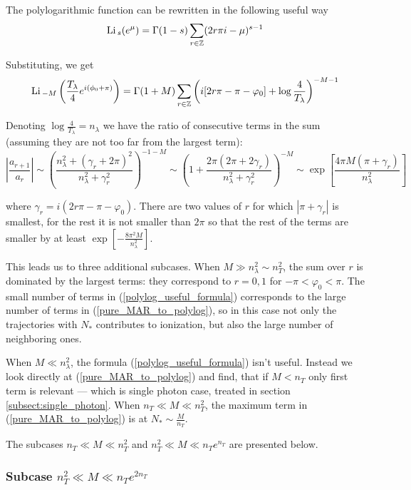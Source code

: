 The polylogarithmic function can be rewritten in the following useful way
\begin{gather}
\label{polylog_useful_formula}
	\mathrm{Li}\,_{s}(e^{\mu})=\Gamma(1-s)\sum_{r\in\mathbb{Z}}(2r\pi i-\mu)^{s-1}
\end{gather}

Substituting, we get
\[
\mathrm{Li}\,_{-M}\left(\frac{T_{\lambda}}{4}e^{i(\phi_{0}+\pi)}\right)=\Gamma(1+M)\sum_{r\in\mathbb{Z}}\left(i[2r\pi-\pi-\varphi_{0}]+\log\frac{4}{T_{\lambda}}\right)^{-M-1}
\]

Denoting $\log\frac{4}{T_{\lambda}}=n_{\lambda}$ we have the ratio
of consecutive terms in the sum (assuming they are not too far from
the largest term):
\[
\left|\frac{a_{r+1}}{a_{r}}\right|\sim\left(\frac{n_{\lambda}^{2}+(\gamma_{r}+2\pi)^{2}}{n_{\lambda}^{2}+\gamma_{r}^{2}}\right)^{-1-M}\sim\left(1+\frac{2\pi(2\pi+2\gamma_{r})}{n_{\lambda}^{2}+\gamma_{r}^{2}}\right)^{-M}\sim\exp\left[\frac{4\pi M(\pi+\gamma_{r})}{n_{\lambda}^{2}}\right]
\]

where $\gamma_{r}=i(2r\pi-\pi-\varphi_{0})$. There are two values of
$r$ for which $|\pi+\gamma_{r}|$ is smallest, for the rest it is
not smaller than $2\pi$ so that the rest of the terms are smaller
by at least 
$
\exp\left[-\frac{8\pi^{2}M}{n_{\lambda}^{2}}\right]
$.

This leads us to three additional subcases. When $ M \gg n_\lambda^2\sim n_T^2$, the sum over $ r $ is dominated by the  largest terms: they correspond to $ r=0,1 $ for $ -\pi<\varphi_0<\pi $. The small number of terms in (\ref{polylog_useful_formula}) corresponds to the large number of terms in (\ref{pure_MAR_to_polylog}), so in this case not only the trajectories with $ N_* $ contributes to ionization, but also the large number of neighboring ones.

When $ M\ll n_\lambda^2 $, the formula (\ref{polylog_useful_formula}) isn't useful. Instead we look directly at (\ref{pure_MAR_to_polylog}) and find, that if $ M<n_T $ only first term is relevant --- which is single photon case, treated in section \ref{subsect:single_photon}. When $ n_T\ll M\ll n_T^2 $, the maximum term in (\ref{pure_MAR_to_polylog}) is at $ N_*\sim\frac{M}{n_T} $.

The subcases $ n_T \ll M\ll n_T^2 $ and $ n_T^2 \ll M\ll n_T e^{n_T} $ are presented below.

\subsubsection{ Subcase $ n_T^2 \ll M\ll n_T e^{2n_T} $}

